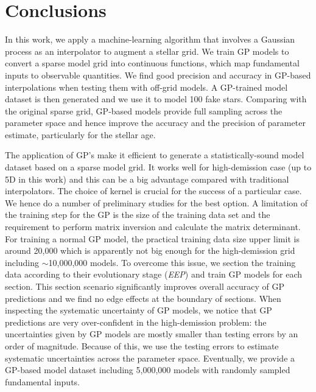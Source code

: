 \section{Conclusions}\label{sec:conclusion}

In this work, we apply a machine-learning algorithm that involves a Gaussian process as an interpolator to augment a stellar grid. We train GP models to convert a sparse model grid into continuous functions, which map fundamental inputs to observable quantities. We find good precision and accuracy in GP-based interpolations when testing them with off-grid models. A GP-trained model dataset is then generated and we use it to model 100 fake stars. Comparing with the original sparse grid, GP-based models provide full sampling across the parameter space and hence improve the accuracy and the precision of parameter estimate, particularly for the stellar age.

The application of GP's make it efficient to generate a statistically-sound model dataset based on a sparse model grid. It works well for high-demission case (up to 5D in this work) and this can be a big advantage compared with traditional interpolators. The choice of kernel is crucial for the success of a particular case. We hence do a number of preliminary studies for the best option. A limitation of the training step for the GP is the size of the training data set and the requirement to perform matrix inversion and calculate the matrix determinant. For training a normal GP model, the practical training data size upper limit is around 20,000 which is apparently not big enough for the high-demission grid including $\sim$10,000,000 models. To overcome this issue, we section the training data according to their evolutionary stage ({\it EEP}) and train GP models for each section. This section scenario significantly improves overall accuracy of GP predictions and we find no edge effects at the boundary of sections. When inspecting the systematic uncertainty of GP models, we notice that GP predictions are very over-confident in the high-demission problem: the uncertainties given by GP models are mostly smaller than testing errors by an order of magnitude. Because of this,  we use the testing errors to estimate systematic uncertainties across the parameter space. Eventually, we provide a GP-based model dataset including 5,000,000 models with randomly sampled fundamental inputs.

